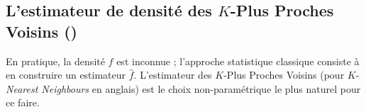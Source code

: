            
            


\subsection{L'estimateur de densité des $K$-Plus Proches Voisins (\KNN)}

En pratique, la densité $f$ est inconnue ; l'approche statistique classique consiste à en construire un estimateur $\widehat f$.
L'estimateur des $K$-Plus Proches Voisins (\KNN pour $K$-\emph{Nearest Neighbours} en anglais) \cite{BiauDevroye} est le choix non-paramétrique le plus naturel pour ce faire.

